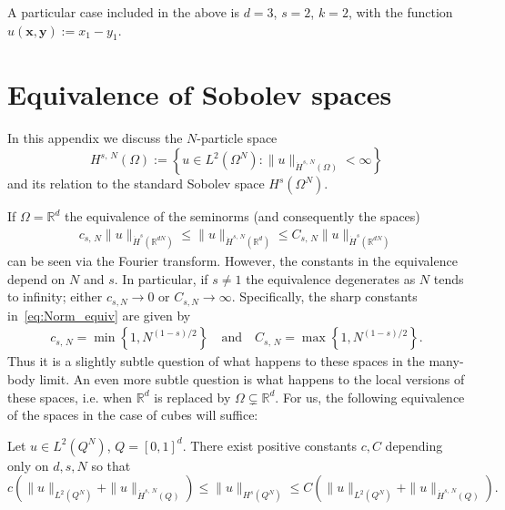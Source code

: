 \documentclass[AHL, Unicode, longabstracts, published]{cedram}
\newcommand*\R {\mathbb{R}}
\newcommand\1{{\ensuremath {\mathds 1} }}
\newcommand{\bx}{\mathbf{x}}
\newcommand{\by}{\mathbf{y}}
\begin{document}
A particular case included in the above is $d=3$, $s=2$, $k=2$, with the function $u(\bx,\by) := x_1 - y_1$.



\appendix
\section{Equivalence of Sobolev spaces}\label{app:norms}


In this appendix we discuss the $N$-particle space
\begin{equation*}
H^{s,\,N}(\Omega) := \left\{u \in L^2(\Omega^N): \|u\|_{\dot{H}^{s,\,N}(\Omega)}<\infty\right\}
\end{equation*}
and its relation to the standard Sobolev space $H^s(\Omega^N)$.


If $\Omega=\R^d$ the equivalence of the seminorms (and consequently the spaces)
\begin{align}\label{eq:Norm_equiv}
c_{s,\,N}\|u\|_{\dot{H}^s(\R^{dN})}\leq \|u\|_{\dot{H}^{s,\,N}(\R^{d})}\leq C_{s,\,N}\|u\|_{\dot{H}^s(\R^{dN})}
\end{align}
can be seen via the Fourier transform. However, the constants in the equivalence depend on $N$ and $s$. In particular, if $s\neq 1$ the equivalence degenerates as $N$ tends to infinity; either $c_{s,N}\to 0$ or $C_{s,N}\to \infty$. Specifically, the sharp constants in~\eqref{eq:Norm_equiv} are given by
\begin{align*}
c_{s,\,N}=\min\left\{1, N^{(1-s)/2}\right\}
\quad \text{and} \quad C_{s,\,N}= \max\left\{1, N^{\left(1-s\right)/2}\right\}.
\end{align*}
Thus it is a slightly subtle question of what happens to these spaces in the many-body limit. An even more subtle question is what happens to the local versions of these spaces, i.e. when $\R^d$ is replaced by $\Omega \subsetneq \R^d$. For us, the following equivalence of the spaces in the case of cubes will suffice:

\begin{lemm}\label{lem:Equivalence_local_spaces}
Let $u\in L^2(Q^N)$, $Q=[0, 1]^{d}$. There exist positive constants $c, C$ depending only on $d, s, N$ so that
\begin{equation*}
c\left(\|u\|_{L^2\left(Q^N\right)}+\|u\|_{\dot{H}^{s,\,N}(Q)}\right)\leq \|u\|_{H^s(Q^N)}\leq C \left(\|u\|_{L^2\left(Q^N\right)}+\|u\|_{\dot{H}^{s,\,N}(Q)}\right).
\end{equation*}
\end{lemm}
\end{document}
